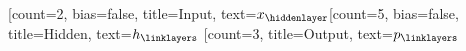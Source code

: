 \documentclass[convert]{standalone}
\begin{document}
\begin{neuralnetwork}[height=4.5]
    \newcommand{\nodetextclear}[2]{}
    \newcommand{\nodetextx}[2]{$x_#2$}
    \newcommand{\nodetextp}[2]{$p_#2$}
    \newcommand{\nodetexth}[2]{$h_#2$}
    [count=2, bias=false, title=Input, text=\nodetextx]
    \hiddenlayer[count=5, bias=false, title=Hidden, text=\nodetexth] \linklayers
    \outputlayer[count=3, title=Output, text=\nodetextp] \linklayers
\end{neuralnetwork}
\end{document}
